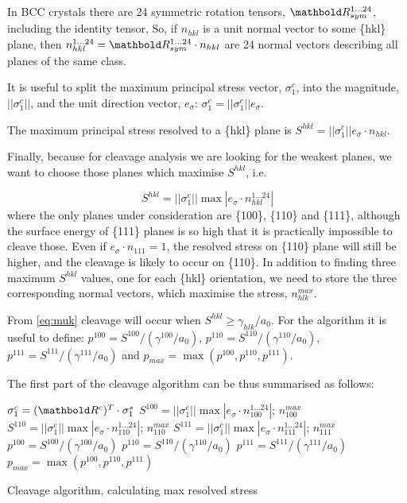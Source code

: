 In BCC crystals there are 24 symmetric rotation tensors,
$\tenrtwo{R}_{sym}^{1\ldots 24}$,
including the identity tensor, 
So, if $n_{hkl}$ is a unit normal vector to some \{hkl\} plane,
then $n_{hkl}^{1\ldots 24} = 
\tenrtwo{R}_{sym}^{1\ldots 24} \cdot n_{hkl}$ are 24 normal
vectors describing all planes of the same class.

It is useful to split the maximum principal stress vector,
$\sigma_{1}^{c}$, into the magnitude, $||\sigma_{1}^{c}||$,
and the unit direction vector, $e_\sigma$:
$\sigma_{1}^{c} = ||\sigma_{1}^{c}|| e_\sigma$.

The maximum principal stress resolved to a \{hkl\} plane
is $S^{hkl} = ||\sigma_{1}^{c}|| e_\sigma \cdot n_{hkl}$.

Finally, because for cleavage analysis we are looking
for the weakest planes, we want to choose those planes
which maximise $S^{hkl}$, i.e.

\begin{equation}
 S^{hkl}
  =
   ||\sigma_{1}^{c}||
    \max
     \left|
       e_\sigma \cdot n_{hkl}^{1\ldots 24}
     \right|
\label{eq:hok}
\end{equation}
%
where the only planes under consideration
are \{100\}, \{110\} and \{111\}, although the surface
energy of \{111\} planes is so high that it is practically
impossible to cleave those.
Even if $e_\sigma \cdot n_{111}=1$, the resolved stress
on \{110\} plane will still be higher, and the cleavage
is likely to occur on \{110\}.
In addition to finding three maximum $S^{hkl}$ values,
one for each \{hkl\} orientation, we need to store
the three corresponding normal vectors, which
maximise the stress, $n_{hlk}^{max}$.

From \eqref{eq:muk} cleavage will occur when
$S^{hkl} \ge \gamma_{hlk}/a_0$.
For the algorithm it is useful to define:
$p^{100}=S^{100}/(\gamma^{100}/a_0)$,
$p^{110}=S^{110}/(\gamma^{110}/a_0)$,
$p^{111}=S^{111}/(\gamma^{111}/a_0)$
and 
$p_{max}=\max( p^{100}, p^{110}, p^{111})$.

The first part of the cleavage algorithm
can be thus summarised as follows:

\begin{algorithm}[H]
\SetAlgoLined

\BlankLine
$\sigma_{1}^{c} = (\tenrtwo{R}^c)^T \cdot \sigma_1^s$\;
$ S^{100} = ||\sigma_{1}^{c}||
  \max \left| e_\sigma \cdot n_{100}^{1\ldots 24}
     \right|$; $n_{100}^{max}$ \;
$ S^{110} = ||\sigma_{1}^{c}||
  \max \left| e_\sigma \cdot n_{110}^{1\ldots 24}
     \right|$; $n_{110}^{max}$ \;
$ S^{111} = ||\sigma_{1}^{c}||
  \max \left| e_\sigma \cdot n_{111}^{1\ldots 24}
     \right|$; $n_{111}^{max}$ \;
$p^{100}=S^{100}/(\gamma^{100}/a_0)$ \;
$p^{110}=S^{110}/(\gamma^{110}/a_0)$ \;
$p^{111}=S^{111}/(\gamma^{111}/a_0)$ \;
$p_{max}=\max( p^{100}, p^{110}, p^{111})$\;
\caption{
Cleavage algorithm, calculating max resolved
stress}
\label{algo:clvg1:p}
\end{algorithm}

